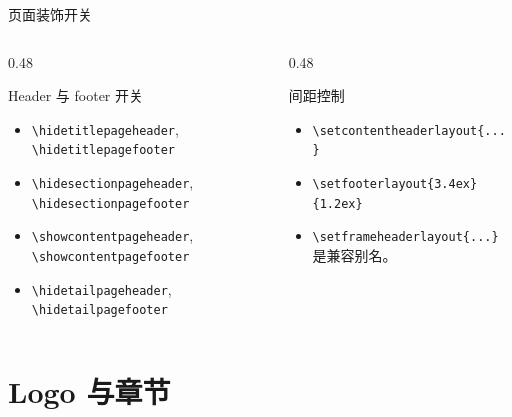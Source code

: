 \documentclass[aspectratio=169,10pt]{ctexbeamer}
\begin{document}
\begin{academicframe}[页面类型开关与细节间距]{页面装饰开关}
  \begin{columns}[T,onlytextwidth]
    \begin{column}{0.48\textwidth}
      \begin{block}{Header 与 footer 开关}
        \scriptsize
        \begin{itemize}
          \item \texttt{\textbackslash hidetitlepageheader},
            \texttt{\textbackslash hidetitlepagefooter}
          \item \texttt{\textbackslash hidesectionpageheader},
            \texttt{\textbackslash hidesectionpagefooter}
          \item \texttt{\textbackslash showcontentpageheader},
            \texttt{\textbackslash showcontentpagefooter}
          \item \texttt{\textbackslash hidetailpageheader},
            \texttt{\textbackslash hidetailpagefooter}
        \end{itemize}
      \end{block}
    \end{column}
    \begin{column}{0.48\textwidth}
      \begin{exampleblock}{间距控制}
        \scriptsize
        \begin{itemize}
          \item \texttt{\textbackslash setcontentheaderlayout\{...\}}
          \item \texttt{\textbackslash setfooterlayout\{3.4ex\}\{1.2ex\}}
          \item \texttt{\textbackslash setframeheaderlayout\{...\}} 是兼容别名。
        \end{itemize}
      \end{exampleblock}
    \end{column}
  \end{columns}
\end{academicframe}

\section{Logo 与章节}
\end{document}
